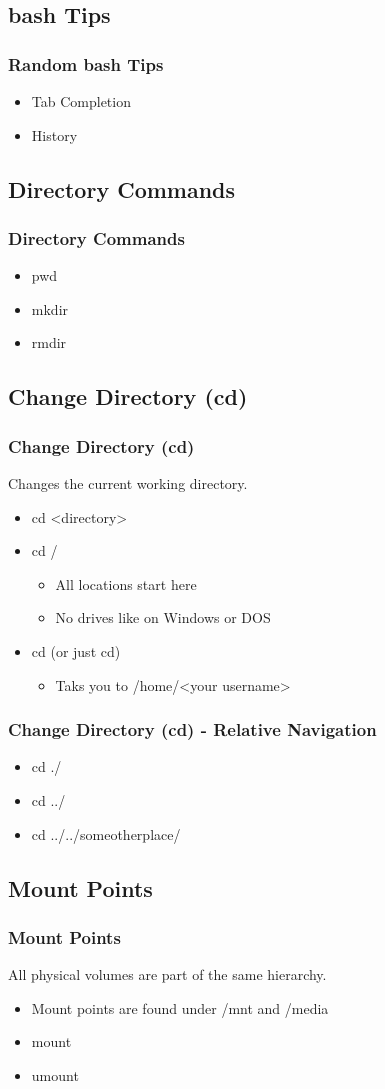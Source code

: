 \documentclass[hyperref={pdfpagelabels=false}]{beamer}
\begin{document}
\subsection{bash Tips}	
\frame
{
    \frametitle{Random bash Tips}
    \begin{itemize}
    \item{Tab Completion}
    \item{History}
    \end{itemize}
}
\subsection{Directory Commands}
\frame
{
    \frametitle{Directory Commands}
    \begin{itemize}
    \item{pwd}
    \item{mkdir}
    \item{rmdir}
    \end{itemize}
}
\subsection{Change Directory (cd)}
\frame
{
    \frametitle{Change Directory (cd)}
    Changes the current working directory.
    \begin{itemize}
    \item{cd <directory>}
    \item{cd /}
        \begin{itemize}
        \item{All locations start here}
        \item{No drives like on Windows or DOS}
        \end{itemize}
    \item{cd \texttildelow (or just cd)}
        \begin{itemize}
        \item{Taks you to /home/<your username>}
        \end{itemize}
    \end{itemize}
}
\frame
{
    \frametitle{Change Directory (cd) - Relative Navigation}
    \begin{itemize}
    \item{cd ./}
    \item{cd ../}
    \item{cd ../../someotherplace/}
    \end{itemize}
}
\subsection{Mount Points}
\frame
{
    \frametitle{Mount Points}
    All physical volumes are part of the same hierarchy.
    \begin{itemize}
    \item{Mount points are found under /mnt and /media}
    \item{mount}
    \item{umount}
    \end{itemize}
}
\end{document}
